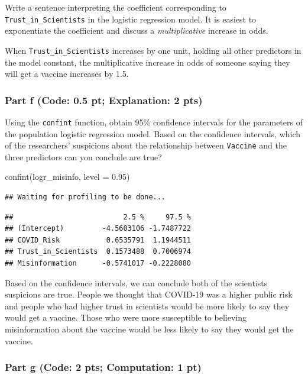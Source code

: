 \documentclass[
]{article}
\newenvironment{Shaded}{\begin{snugshade}}{\end{snugshade}}
\newcommand{\AttributeTok}[1]{\textcolor[rgb]{0.77,0.63,0.00}{#1}}
\newcommand{\FloatTok}[1]{\textcolor[rgb]{0.00,0.00,0.81}{#1}}
\newcommand{\FunctionTok}[1]{\textcolor[rgb]{0.00,0.00,0.00}{#1}}
\newcommand{\NormalTok}[1]{#1}
\begin{document}
Write a sentence interpreting the coefficient corresponding to
\texttt{Trust\_in\_Scientists} in the logistic regression model. It is
easiest to exponentiate the coefficient and discuss a
\emph{multiplicative} increase in odds.

When \texttt{Trust\_in\_Scientists} increases by one unit, holding all
other predictors in the model constant, the multiplicative increase in
odds of someone saying they will get a vaccine increases by 1.5.

\hypertarget{part-f-code-0.5-pt-explanation-2-pts}{%
\subsubsection{Part f (Code: 0.5 pt; Explanation: 2
pts)}\label{part-f-code-0.5-pt-explanation-2-pts}}

Using the \texttt{confint} function, obtain 95\% confidence intervals
for the parameters of the population logistic regression model. Based on
the confidence intervals, which of the researchers' suspicions about the
relationship between \texttt{Vaccine} and the three predictors can you
conclude are true?

\begin{Shaded}
\begin{Highlighting}[]
\FunctionTok{confint}\NormalTok{(logr\_misinfo, }\AttributeTok{level =} \FloatTok{0.95}\NormalTok{)}
\end{Highlighting}
\end{Shaded}

\begin{verbatim}
## Waiting for profiling to be done...
\end{verbatim}

\begin{verbatim}
##                          2.5 %     97.5 %
## (Intercept)         -4.5603106 -1.7487722
## COVID_Risk           0.6535791  1.1944511
## Trust_in_Scientists  0.1573488  0.7006974
## Misinformation      -0.5741017 -0.2228080
\end{verbatim}

Based on the confidence intervals, we can conclude both of the
scientists suspicions are true. People we thought that COVID-19 was a
higher public risk and people who had higher trust in scientists would
be more likely to say they would get a vaccine. Those who were more
susceptible to believing misinformation about the vaccine would be less
likely to say they would get the vaccine.

\hypertarget{part-g-code-2-pts-computation-1-pt}{%
\subsubsection{Part g (Code: 2 pts; Computation: 1
pt)}\label{part-g-code-2-pts-computation-1-pt}}
\end{document}
